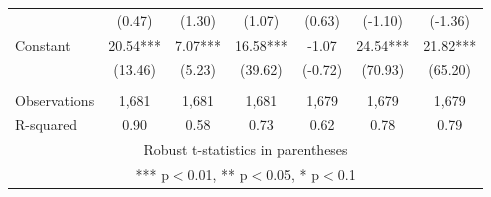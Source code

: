 \documentclass[]{article}
\begin{document}
\begin{tabular}{lcccccc}
 & (0.47) & (1.30) & (1.07) & (0.63) & (-1.10) & (-1.36) \\
Constant & 20.54*** & 7.07*** & 16.58*** & -1.07 & 24.54*** & 21.82*** \\
 & (13.46) & (5.23) & (39.62) & (-0.72) & (70.93) & (65.20) \\
 &  &  &  &  &  &  \\
Observations & 1,681 & 1,681 & 1,681 & 1,679 & 1,679 & 1,679 \\
 R-squared & 0.90 & 0.58 & 0.73 & 0.62 & 0.78 & 0.79 \\ \hline
\multicolumn{7}{c}{ Robust t-statistics in parentheses} \\
\multicolumn{7}{c}{ *** p$<$0.01, ** p$<$0.05, * p$<$0.1} \\
\end{tabular}
\end{document}
